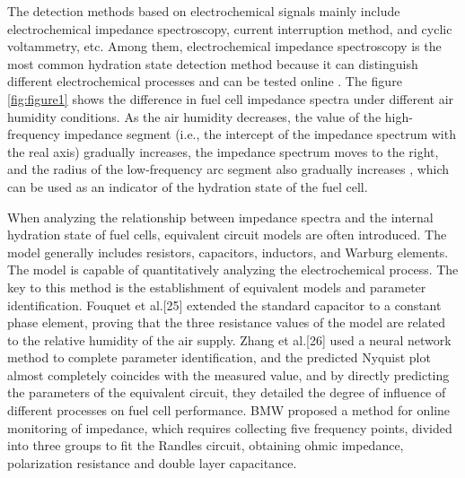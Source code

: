 The detection methods based on electrochemical signals mainly include electrochemical impedance spectroscopy, current interruption method, and cyclic voltammetry, etc. Among them, electrochemical impedance spectroscopy is the most common hydration state detection method because it can distinguish different electrochemical processes and can be tested online \cite{yousfisteinerDiagnosisPolymerElectrolyte2011,chenOperationCharacteristicsCarbon2015}. The figure \ref{fig:figure1} shows the difference in fuel cell impedance spectra under different air humidity conditions. As the air humidity decreases, the value of the high-frequency impedance segment (i.e., the intercept of the impedance spectrum with the real axis) gradually increases, the impedance spectrum moves to the right, and the radius of the low-frequency arc segment also gradually increases \cite{hussainiVisualizationQuantificationCathode2009,mocoteguy_study_2020,laribi_impedance_2016}, which can be used as an indicator of the hydration state of the fuel cell.
\par
When analyzing the relationship between impedance spectra and the internal hydration state of fuel cells, equivalent circuit models are often introduced. The model generally includes resistors, capacitors, inductors, and Warburg elements\cite{tangRecentProgressUse2020}. The model is capable of quantitatively analyzing the electrochemical process.  The key to this method is the establishment of equivalent models and parameter identification. Fouquet et al.[25] extended the standard capacitor to a constant phase element, proving that the three resistance values of the model are related to the relative humidity of the air supply. Zhang et al.[26] used a neural network method to complete parameter identification, and the predicted Nyquist plot almost completely coincides with the measured value, and by directly predicting the parameters of the equivalent circuit, they detailed the degree of influence of different processes on fuel cell performance. BMW proposed a method for online monitoring of impedance, which requires collecting five frequency points, divided into three groups to fit the Randles circuit, obtaining ohmic impedance, polarization resistance and double layer capacitance\cite{fouquetModelBasedPEM2006}.
